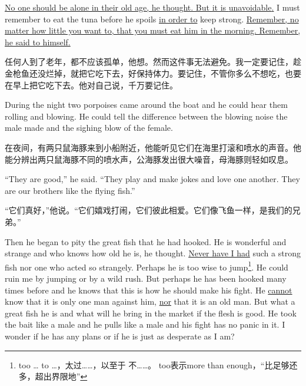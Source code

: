 \begin{paracol}{2}
\switchcolumn*

\uline{No one should be alone in their old age, he thought. But it is
\gls{unavoidable}.} I must remember to eat the tuna before he \glspl{spoil}
\uline{in order to} keep strong. \uline{Remember, no matter how little you want to,
that you must eat him in the morning. Remember, he said to himself.}

\switchcolumn

任何人到了老年，都不应该孤单，他想。然而这件事无法避免。我一定要记住，趁金枪鱼还没烂掉，就把它吃下去，好保持体力。要记住，不管你多么不想吃，也要在早上把它吃下去。他对自己说，千万要记住。

\switchcolumn*

During the night two \glspl{porpoise} came around the boat and he could hear
them \gls{rolling} and \gls{blowing}. He could tell the difference between
the blowing noise the \gls{male} made and the \gls{sighing} blow of the
\gls{female}.

\switchcolumn

在夜间，有两只鼠海豚来到小船附近，他能听见它们在海里打滚和喷水的声音。他能分辨出两只鼠海豚不同的喷水声，公海豚发出很大噪音，母海豚则轻如叹息。

\switchcolumn*

``They are good,'' he said. ``They play and make jokes and love one another.
They are our brothers like the flying fish.''

\switchcolumn

“它们真好，”他说。“它们嬉戏打闹，它们彼此相爱。它们像飞鱼一样，是我们的兄弟。”

\switchcolumn*

Then he began to pity the great fish that he had hooked. He is wonderful and
strange and who knows how old he is, he thought. \uline{Never have I had}
such a strong fish nor one who \gls{acted} so strangely. Perhaps he is too
\gls{wise} to jump\footnote{too \ldots{} to \ldots{}，太过……，以至于
  不……。 too表示more than enough，“比足够还多，超出界限地”}. He could
\gls{ruin} me by jumping or by a wild rush. But perhaps he has been hooked
many times before and he knows that this is how he should make his fight. He
\uline{cannot} know that it is only one man against him, \uline{nor} that it
is an old man. But what a great fish he is and what will he bring in the
market if the flesh is good. He took the bait like a male and he pulls like
a male and his fight has no panic in it. I wonder if he has any plans or if
he is just as \gls{desperate} as I am?


\end{paracol}
